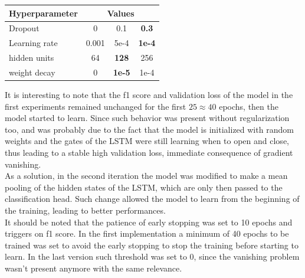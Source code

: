             \begin{table}[H]
                \centering
                \begin{tabular}{l c c c}
                    \toprule
                    \multicolumn{1}{l}{\textbf{Hyperparameter}} & \multicolumn{3}{c}{\textbf{Values}} \\                  \midrule
                    Dropout & 0 & 0.1 & \textbf{0.3} \\
                    Learning rate & 0.001 & 5e-4 & \textbf{1e-4} \\
                    hidden units & 64 & \textbf{128} & 256 \\
                    weight decay & 0 & \textbf{1e-5} & 1e-4 \\
                    \bottomrule
                \end{tabular}
                \label{tab:lstm_hyperparams}
            \end{table}

            It is interesting to note that the f1 score and validation loss of the model
            in the first experiments remained unchanged for the first $25\approx40$ epochs, 
            then the model started to learn. Since such behavior was present without 
            regularization too, and was probably due to the fact that the model is initialized 
            with random weights and the gates of the LSTM were still learning when to open 
            and close, thus leading to a stable high validation loss, immediate consequence 
            of gradient vanishing.\\

            As a solution, in the second iteration the model was modified to make a 
            mean pooling of the hidden states of the LSTM, which are only then passed to
            the classification head. Such change allowed the model to learn from the 
            beginning of the training, leading to better performances.\\

            It should be noted that the patience of early stopping was set to 10 epochs and
            triggers on f1 score. In the first implementation a minimum of 40 epochs to be trained
            was set to avoid the early stopping to stop the training before starting to learn. In the last version
            such threshold was set to 0, since the vanishing problem wasn't present anymore with the same
            relevance.\\ 

